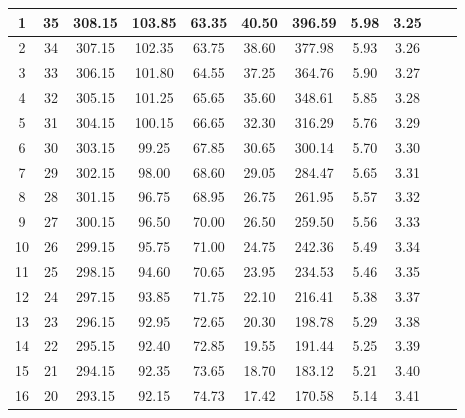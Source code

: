 \begin{center}
\begin{table}[h]
\begin{tabular}{|c|c|c|c|c|c|c|c|c|c|c|}
 1 & 35 & 308.15 & 103.85 & 63.35 & 40.50 & 396.59 & 5.98 & 3.25  \\ \hline
 2 & 34 & 307.15 & 102.35 & 63.75 & 38.60 & 377.98 & 5.93 & 3.26  \\ \hline
 3 & 33 & 306.15 & 101.80 & 64.55 & 37.25 & 364.76 & 5.90 & 3.27  \\ \hline
 4 & 32 & 305.15 & 101.25 & 65.65 & 35.60 & 348.61 & 5.85 & 3.28  \\ \hline
 5 & 31 & 304.15 & 100.15 & 66.65 & 32.30 & 316.29 & 5.76 & 3.29  \\ \hline
 6 & 30 & 303.15 &  99.25 & 67.85 & 30.65 & 300.14 & 5.70 & 3.30  \\ \hline
 7 & 29 & 302.15 &  98.00 & 68.60 & 29.05 & 284.47 & 5.65 & 3.31  \\ \hline
 8 & 28 & 301.15 &  96.75 & 68.95 & 26.75 & 261.95 & 5.57 & 3.32  \\ \hline
 9 & 27 & 300.15 &  96.50 & 70.00 & 26.50 & 259.50 & 5.56 & 3.33  \\ \hline
10 & 26 & 299.15 &  95.75 & 71.00 & 24.75 & 242.36 & 5.49 & 3.34  \\ \hline
11 & 25 & 298.15 &  94.60 & 70.65 & 23.95 & 234.53 & 5.46 & 3.35  \\ \hline
12 & 24 & 297.15 &  93.85 & 71.75 & 22.10 & 216.41 & 5.38 & 3.37  \\ \hline
13 & 23 & 296.15 &  92.95 & 72.65 & 20.30 & 198.78 & 5.29 & 3.38  \\ \hline
14 & 22 & 295.15 &  92.40 & 72.85 & 19.55 & 191.44 & 5.25 & 3.39  \\ \hline
15 & 21 & 294.15 &  92.35 & 73.65 & 18.70 & 183.12 & 5.21 & 3.40  \\ \hline
16 & 20 & 293.15 &  92.15 & 74.73 & 17.42 & 170.58 & 5.14 & 3.41  \\ \hline
\end{tabular}
\end{table}
\end{center}


